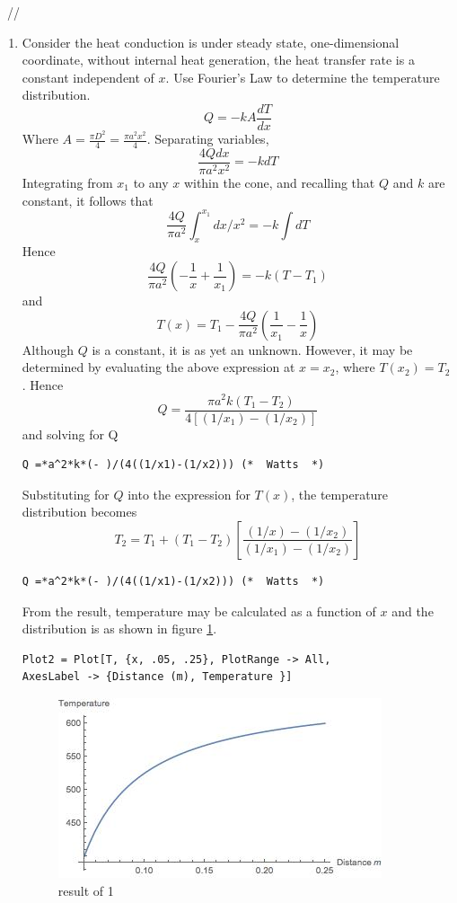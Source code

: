 \begin{solution}
~//
\begin{enumerate}
\item
Consider the heat conduction is under steady state, one-dimensional coordinate,
without internal heat generation, the heat transfer rate is a constant independent
of $x$. Use Fourier’s Law to determine the temperature distribution.
$$Q=-kA\frac{dT}{dx}$$
Where $A=\frac{\pi D^2}{4}=\frac{\pi a^2x^2}{4}$. Separating variables,
$$\frac{4Qdx}{\pi a^2x^2}=-kdT$$
Integrating from $x_1$ to any $x$ within the cone, and recalling that $Q$ and $k$
are constant, it follows that
$$\frac{4Q}{\pi a^2}\int_x^{x_1} dx/x^2=-k\int dT$$
Hence
$$\frac{4Q}{\pi a^2}\left(-\frac{1}{x}+\frac{1}{x_1}\right)=-k\left(T-T_1\right)$$
and
$$T(x)=T_1-\frac{4Q}{\pi a^2}\left(\frac{1}{x_1}-\frac{1}{x}\right)$$
Although $Q$ is a constant, it is as yet an unknown.
However, it may be determined by evaluating the above expression at
$x=x_2$, where $T(x_2)=T_2$. Hence
$$Q=\frac{\pi a^2k(T_1-T_2)}{4[(1/x_1)-(1/x_2)]}$$
and solving for Q
\begin{lstlisting}
Q =*a^2*k*(- )/(4((1/x1)-(1/x2))) (*  Watts  *)
\end{lstlisting}
Substituting for $Q$ into the expression for $T(x)$,
the temperature distribution becomes
$$T_2=T_1+(T_1-T_2)\left[\frac{(1/x)-(1/x_2)}{(1/x_1)-(1/x_2)}\right]$$
\begin{lstlisting}
Q =*a^2*k*(- )/(4((1/x1)-(1/x2))) (*  Watts  *)
\end{lstlisting}
From the result, temperature may be calculated as a function of $x$
and the distribution is as shown in figure \ref{fig:2:4}.
\begin{lstlisting}
Plot2 = Plot[T, {x, .05, .25}, PlotRange -> All, 
AxesLabel -> {Distance (m), Temperature }]
\end{lstlisting}
\begin{figure}[h!]
  \centering
    \includegraphics[scale=0.8]{figures/ch2/4}
    \caption{result of 1}
    \label{fig:2:4}
\end{figure}

\end{enumerate}
\end{solution}
